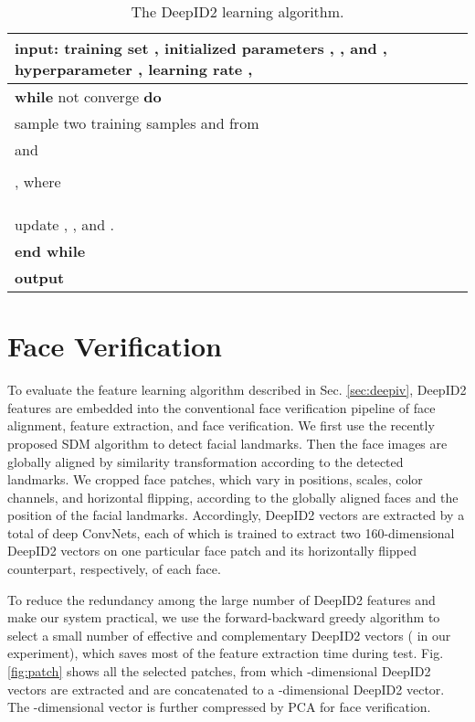 \documentclass{article} \usepackage{nips14submit_e,times}
\begin{document}
\begin{table*}[t]
\caption{The DeepID2 learning algorithm.}
\label{tab:learn}
\begin{center}
\begin{tabular}{p{350pt}}
\toprule
\textbf{input}: training set , initialized parameters , , and , hyperparameter , learning rate ,  \\
\midrule
\textbf{while} not converge \textbf{do} \\
\quad 
\quad sample two training samples  and  from  \\
\quad  and  \\
\quad  \\
\quad , where  \\
\quad  \\
\quad  \\
\quad  \\
\quad update , , and . \\
\textbf{end while} \\
\textbf{output}  \\
\bottomrule
\end{tabular}
\end{center}
\end{table*}


\section{Face Verification}

To evaluate the feature learning algorithm described in Sec. \ref{sec:deepiv}, DeepID2 features are embedded into the conventional face verification pipeline of face alignment, feature extraction, and face verification. We first use the recently proposed SDM algorithm \cite{xiong2013} to detect  facial landmarks. Then the face images are globally aligned by similarity transformation according to the detected landmarks. We cropped  face patches, which vary in positions, scales, color channels, and horizontal flipping, according to the globally aligned faces and the position of the facial landmarks. Accordingly,  DeepID2 vectors are extracted by a total of  deep ConvNets, each of which is trained to extract two 160-dimensional DeepID2 vectors on one particular face patch and its horizontally flipped counterpart, respectively, of each face.

To reduce the redundancy among the large number of DeepID2 features and make our system practical, we use the forward-backward greedy algorithm \cite{zhang2011} to select a small number of effective and complementary DeepID2 vectors ( in our experiment), which saves most of the feature extraction time during test.
Fig. \ref{fig:patch} shows all the selected  patches, from which  -dimensional DeepID2 vectors are extracted and are concatenated to a -dimensional DeepID2 vector. The -dimensional vector is further compressed by PCA for face verification.
\end{document}
